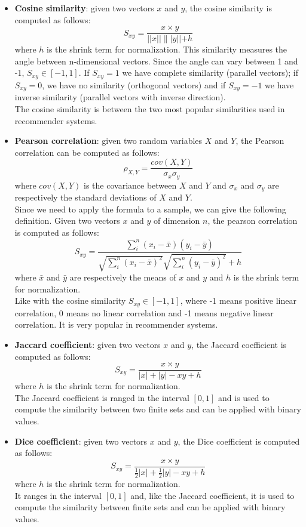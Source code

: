 \begin{itemize}

\item \textbf{Cosine similarity}: given two vectors $x$ and $y$, the cosine similarity is computed as follows:
\[ S_{xy} = \frac{x \times y}{||x||\||y|| + h} \]
where $h$ is the shrink term for normalization.
This similarity measures the angle between n-dimensional vectors. Since the angle can vary between 1 and -1, $S_{xy} \in [-1, 1]$. If $S_{xy} = 1$ we have complete similarity (parallel vectors); if $S_{xy} = 0$, we have no similarity (orthogonal vectors) and if $S_{xy} = -1$ we have inverse similarity (parallel vectors with inverse direction).\\
The cosine similarity is between the two most popular similarities used in recommender systems.

\item \textbf{Pearson correlation}: given two random variables $X$ and $Y$, the Pearson correlation can be computed as follows:
\[ \rho_{X,Y} = \frac{cov(X,Y)}{\sigma_x \sigma_y} \]
where $cov(X,Y)$ is the covariance between $X$ and $Y$ and $\sigma_x$ and $\sigma_y$ are respectively the standard deviations of $X$ and $Y$.\\
Since we need to apply the formula to a sample, we can give the following definition. Given two vectors $x$ and $y$ of dimension $n$, the pearson correlation is computed as follows:
\[ S_{xy} = \frac{\sum_{i}^{n} (x_i - \bar{x})(y_i - \bar{y})}{\sqrt{\sum_{i}^{n} (x_i - \bar{x})^2}\sqrt{\sum_{i}^{n} (y_i - \bar{y})^2} + h} \]
where $\bar{x}$ and $\bar{y}$ are respectively the means of $x$ and $y$ and $h$ is the shrink term for normalization.\\
Like with the cosine similarity $S_{xy} \in [-1, 1]$, where -1 means positive linear correlation, 0 means no linear correlation and -1 means negative linear correlation. It is very popular in recommender systems.

\item \textbf{Jaccard coefficient}: given two vectors $x$ and $y$, the Jaccard coefficient is computed as follows:
\[ S_{xy} = \frac{x \times y}{|x| + |y| - xy + h} \]
where $h$ is the shrink term for normalization.\\
The Jaccard coefficient is ranged in the interval $[0, 1]$ and is used to compute the similarity between two finite sets and can be applied with binary values.

\item \textbf{Dice coefficient}: given two vectors $x$ and $y$, the Dice coefficient is computed as follows:
\[ S_{xy} = \frac{x \times y}{\frac{1}{2}|x| + \frac{1}{2}|y| - xy + h} \]
where $h$ is the shrink term for normalization.\\
It ranges in the interval $[0, 1]$ and, like the Jaccard coefficient, it is used to compute the similarity between finite sets and can be applied with binary values.


\end{itemize}
